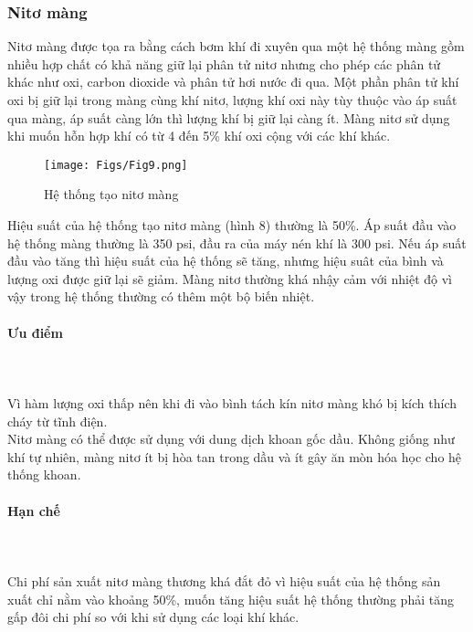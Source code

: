 \documentclass[12pt,a4paper]{article}
\newcommand{\subsubsubsection}[1]{\paragraph{#1}\mbox{}\\}
\begin{document}
\subsubsection{Nitơ màng}
	Nitơ màng\cite{rehm2013underbalanced} được tọa ra bằng cách bơm khí đi xuyên qua một hệ thống màng gồm nhiều hợp chất có khả năng giữ lại phân tử nitơ nhưng cho phép các phân tử khác như oxi, carbon dioxide và phân tử hơi nước đi qua. Một phần phân tử khí oxi bị giữ lại trong màng cùng khí nitơ, lượng khí oxi này tùy thuộc vào áp suất qua màng, áp suất càng lớn thì lượng khí bị giữ lại càng ít. Màng nitơ sử dụng khi muốn hỗn hợp khí có từ 4 đến 5\% khí oxi cộng với các khí khác. 
	\begin{figure}[h]
	\centering
	\texttt{[image: Figs/Fig9.png]}
	\caption{Hệ thống tạo nitơ màng\cite{rehm2013underbalanced}}
	\end{figure}
	Hiệu suất của hệ thống tạo nitơ màng (hình 8)  thường là 50\%. Áp suất đầu vào hệ thống màng thường là 350 psi, đầu ra của máy nén khí là 300 psi. Nếu áp suất đầu vào tăng thì hiệu suất của hệ thống sẽ tăng, nhưng hiệu suât của bình và lượng oxi được giữ lại sẽ giảm. Màng nitơ thường khá nhậy cảm với nhiệt độ vì vậy trong hệ thống thường có thêm một bộ biến nhiệt. 
	\subsubsubsection{Ưu điểm}\\
		Vì hàm lượng oxi thấp nên khi đi vào bình tách kín nitơ màng khó bị kích thích cháy từ tĩnh điện.\\
		Nitơ màng có thể được sử dụng với dung dịch khoan gốc dầu. Không giống như khí tự nhiên, màng nitơ ít bị hòa tan trong dầu và ít gây ăn mòn hóa học cho hệ thống khoan.
	\subsubsubsection{Hạn chế}\\
		Chi phí sản xuất nitơ màng thương khá đắt đỏ vì hiệu suất của hệ thống sản xuất chỉ nằm vào khoảng 50\%, muốn tăng hiệu suất hệ thống thường phải tăng gấp đôi chi phí so với khi sử dụng các loại khí khác.
\end{document}
